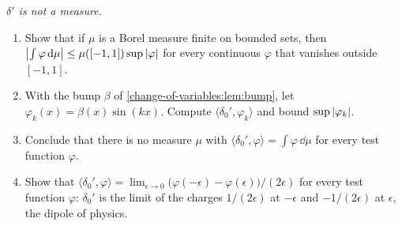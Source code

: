 \begin{notechapter}
\begin{exercise}\label{change-of-variables:exr:10}
\emph{$\delta'$ is not a measure.}
\begin{enumerate}[nosep]
  \item Show that if $\mu$ is a Borel measure finite on bounded sets,
        then $\left|\int\varphi\,\mathrm{d}\mu\right|\leq\mu([-1, 1])\sup\left|\varphi\right|$
        for every continuous $\varphi$ that vanishes outside $[-1, 1]$.
  \item With the bump $\beta$ of \cref{change-of-variables:lem:bump},
        let $\varphi_k(x) = \beta(x)\sin(kx)$. Compute
        $\langle\delta_0', \varphi_k\rangle$ and bound
        $\sup\left|\varphi_k\right|$.
  \item Conclude that there is no measure $\mu$ with
        $\langle\delta_0', \varphi\rangle = \int\varphi\,\dd\mu$ for
        every test function $\varphi$.
  \item Show that
        $\langle\delta_0', \varphi\rangle
        = \lim_{\epsilon\to0}\bigl(\varphi(-\epsilon)
        - \varphi(\epsilon)\bigr)/(2\epsilon)$ for every test function
        $\varphi$: $\delta_0'$ is the limit of the charges
        $1/(2\epsilon)$ at $-\epsilon$ and $-1/(2\epsilon)$ at
        $\epsilon$, the dipole of physics.
\end{enumerate}
\end{exercise}
\end{notechapter}

